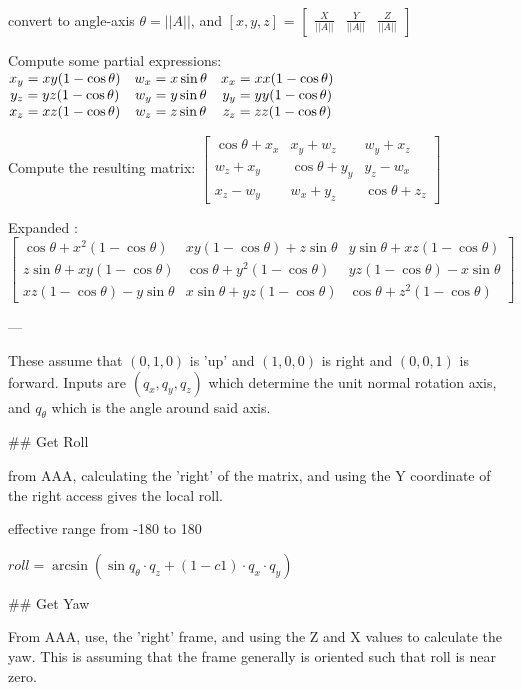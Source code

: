 convert to angle-axis  $ \theta = ||A|| $, and $[x,y,z]$ = $\begin{bmatrix} \frac {X} {||A||} & \frac {Y} {||A||} &  \frac {Z} {||A||} \end{bmatrix} $


Compute some partial expressions:$\begin{matrix}
   x_y = xy(1-\cos \theta) &   w_x = x\sin \theta  &  x_x = xx(1-\cos \theta) \\
   y_z = yz(1-\cos \theta) &    w_y = y\sin \theta &  y_y = yy(1-\cos \theta) \\
   x_z = xz(1-\cos \theta) &    w_z = z\sin \theta &  z_z = zz(1-\cos \theta) 
\end{matrix}\\$


Compute the resulting matrix: $\begin{bmatrix}
\cos \theta+x_x &  x_y + w_z      & w_y + x_z \\
 w_z + x_y      & \cos \theta+y_y & y_z - w_x \\
 x_z - w_y      &  w_x + y_z      & \cos \theta+z_z
\end{bmatrix} $
 

Expanded : $    \begin{bmatrix}
\cos \theta+x^2 (1-\cos \theta)     &   xy(1-\cos \theta) + z\sin \theta & y\sin \theta + xz(1-\cos \theta) \\
 z\sin \theta + xy(1-\cos \theta)   & \cos \theta+y^2 (1-\cos \theta)    & yz(1-\cos \theta) - x\sin \theta \\
xz(1-\cos \theta) - y\sin \theta    &  x\sin \theta + yz(1-\cos \theta)  & \cos \theta+z^{2}(1-\cos \theta)
\end{bmatrix} $


---

These assume that $(0,1,0)$ is 'up' and $(1,0,0)$ is right and $(0,0,1)$ is forward.
Inputs are $(q_x,q_y,q_z)$ which determine the unit normal rotation axis, and $q_{\theta}$ which is the angle around said axis.

## Get Roll

from AAA, calculating the 'right' of the matrix, and using the Y coordinate of the right access gives the local roll.

effective range from -180 to 180


${roll} = \arcsin ({ \sin q_{\theta} \cdot q_z  + (1- c1) \cdot q_x \cdot q_y } )$


## Get Yaw

From AAA, use, the 'right' frame, and using the Z and X values to calculate the yaw.  This is assuming that
the frame generally is oriented such that roll is near zero.


